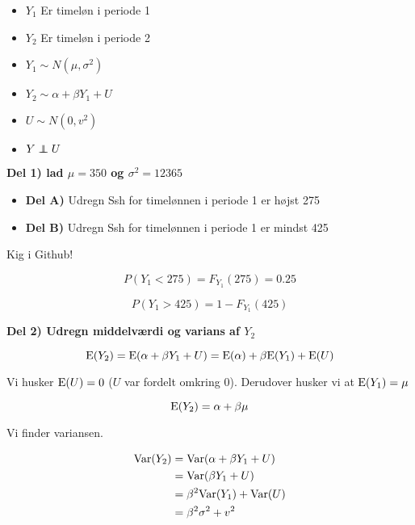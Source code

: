 \begin{itemize}
    \item $Y_1$ Er timeløn i periode 1
    \item $Y_2$ Er timeløn i periode 2
    \item $Y_1 \sim N(\mu, \sigma^2)$
    \item $Y_2 \sim \alpha + \beta Y_1 + U$
    \item $U \sim N(0,v^2)$
    \item $Y \independent U$
\end{itemize}

\textbf{Del 1) lad $\mu = 350$ og $\sigma^2  = 12365$}

\begin{itemize}
    \item \textbf{Del A)} Udregn Ssh for timelønnen i periode 1 er højst 275
    \item \textbf{Del B)} Udregn Ssh for timelønnen i periode 1 er mindst 425
\end{itemize}

Kig i Github!

\begin{equation}
    P(Y_1 < 275) = F_{Y_1}(275) =0.25 
\end{equation}

\begin{equation}
    P(Y_1 > 425) = 1 - F_{Y_1}(425) 
\end{equation}

\textbf{Del 2) Udregn middelværdi og varians af $Y_2$}

\begin{equation}
    \text{E}(Y_2) = \text{E}(\alpha + \beta Y_1 + U) = \text{E}(\alpha) + \beta \text{E}(Y_1) + \text{E}(U)
\end{equation}

Vi husker $\text{E}(U) = 0$ ($U$ var fordelt omkring 0). Derudover husker vi at $\text{E}(Y_1) = \mu$

\begin{equation}
    \text{E}(Y_2) = \alpha + \beta \mu
\end{equation}

Vi finder variansen.

\begin{align}
    \text{Var}(Y_2) &= \text{Var}(\alpha + \beta Y_1 + U) \\
    &= \text{Var}(\beta Y_1 + U) \\
    &= \beta^2 \text{Var}(Y_1) + \text{Var}(U) \\
    &= \beta^2 \sigma^2 + v^2
\end{align}

